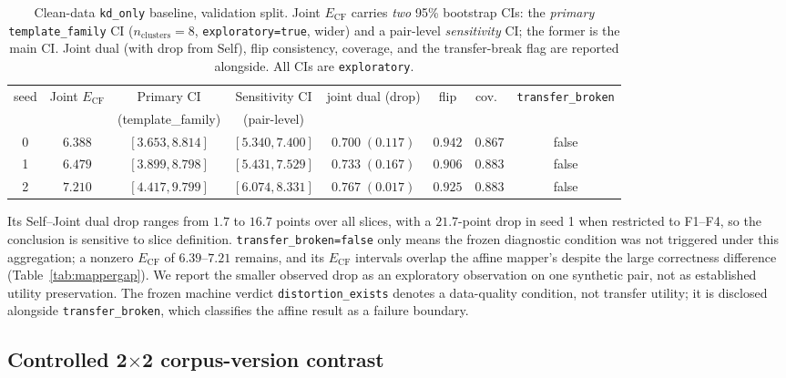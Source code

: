 \documentclass[11pt,a4paper]{article}
\begin{document}
\begin{table}[t]
\centering
\caption{Clean-data \texttt{kd\_only} baseline, validation split. Joint
$E_{\mathrm{CF}}$ carries \emph{two} 95\% bootstrap CIs: the \emph{primary}
\texttt{template\_family} CI ($n_{\mathrm{clusters}}=8$,
\texttt{exploratory=true}, wider) and a pair-level \emph{sensitivity} CI; the
former is the main CI. Joint dual (with drop from Self), flip consistency,
coverage, and the transfer-break flag are reported alongside. All CIs are
\texttt{exploratory}.}
\label{tab:cleankd}
\begin{tabular}{cccccccc}
\toprule
seed & Joint $E_{\mathrm{CF}}$ & Primary CI & Sensitivity CI & joint dual (drop) & flip & cov.\ & \texttt{transfer\_broken} \\
 & & (template\_family) & (pair-level) & & & & \\
\midrule
0 & $6.388$ & $[3.653,8.814]$ & $[5.340,7.400]$ & $0.700\;(0.117)$ & $0.942$ & $0.867$ & false \\
1 & $6.479$ & $[3.899,8.798]$ & $[5.431,7.529]$ & $0.733\;(0.167)$ & $0.906$ & $0.883$ & false \\
2 & $7.210$ & $[4.417,9.799]$ & $[6.074,8.331]$ & $0.767\;(0.017)$ & $0.925$ & $0.883$ & false \\
\bottomrule
\end{tabular}
\end{table}

Its Self--Joint dual drop ranges from $1.7$ to $16.7$ points over all slices,
with a $21.7$-point drop in seed 1 when restricted to F1--F4, so the conclusion
is sensitive to slice definition. \texttt{transfer\_broken=false} only means
the frozen diagnostic condition was not triggered under this aggregation; a
nonzero $E_{\mathrm{CF}}$ of $6.39$--$7.21$ remains, and its $E_{\mathrm{CF}}$
intervals overlap the affine mapper's despite the large correctness difference
(Table~\ref{tab:mappergap}). We report the smaller observed drop as an
exploratory observation on one synthetic pair, not as established utility
preservation. The frozen machine verdict \texttt{distortion\_exists} denotes a
data-quality condition, not transfer utility; it is disclosed alongside
\texttt{transfer\_broken}, which classifies the affine result as a failure
boundary.

\subsection{Controlled 2$\times$2 corpus-version contrast}
\label{sec:audit2x2}
\end{document}
